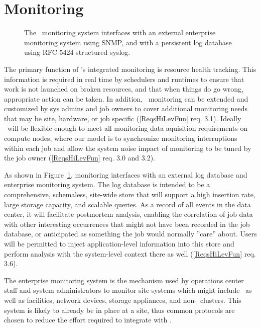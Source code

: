 \section{Monitoring}
\label{sect:monitor}

\begin{figure}
\centering
{}
\caption{The \ngrm\ monitoring system interfaces with an external
enterprise monitoring system using SNMP, and with a persistent log
database using RFC 5424 structured syslog.}
\label{FigMonExt}
\end{figure}

The primary function of \ngrm's integrated monitoring is resource
health tracking.  This information is required in real time by schedulers
and runtimes to ensure that work is not launched on broken resources,
and that when things do go wrong, appropriate action can be taken.
In addition, \ngrm\ monitoring can be extended and customized
by sys admins and job owners to cover additional monitoring needs
that may be site, hardware, or job specific
(\ref{ReqsHiLevFun} req. 3.1).
Ideally \ngrm\ will be flexible enough to meet all
monitoring data aquisition requirements on compute nodes,
where our model is to synchronize monitoring interruptions within each job
and allow the system noise impact of monitoring to be tuned by the job owner
(\ref{ReqsHiLevFun} req. 3.0 and 3.2).

As shown in Figure~\ref{FigMonExt}, monitoring interfaces with an external
log database and enterprise monitoring system.
The log database is intended to be a comprehensive, schemaless, site-wide
store that will support a high insertion rate, large storage capacity,
and scalable queries.
As a record of all events in the data center, it will facilitate
postmortem analysis, enabling the correlation of job data with other
interesting occurrences that might not have been recorded in the job
database, or anticipated as something the job would normally ''care'' about.
Users will be permitted to inject application-level information into this
store and perform analysis with the system-level context there as well
(\ref{ReqsHiLevFun} req. 3.6).

The enterprise monitoring system is the mechanism used by operations center
staff and system administrators to monitor site systems which might include
\ngrm\ as well as facilities, network devices, storage appliances,
and non-\ngrm\ clusters.
This system is likely to already be in place at a site, thus common
protocols are chosen to reduce the effort required to integrate with \ngrm.

